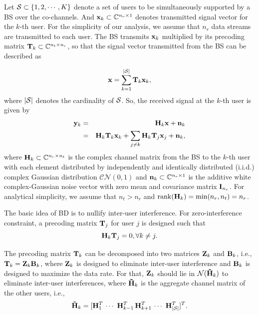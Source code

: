 \documentclass[journal,twoside]{IEEEtranTCOM}
\begin{document}
Let ${\cal{S}} \subset \{1,2,\cdots,K\}$ denote a set of users to be simultaneously supported by a BS over the co-channels. And ${\bf{x}}_k \subset {\mathbb{C}}^{n_r \times 1}$ denotes transmitted signal vector for the $k$-th user. For the simplicity of our analysis, we assume that $n_r$ data streams are transmitted to each user. The BS transmits ${\bf{x}}_k$ multiplied by its precoding matrix ${\bf{T}}_k  \subset {\mathbb{C}}^{n_t \times n_r}$, so that the signal vector transmitted from the BS can be described as

\begin{equation} \label{eq:TransmittedSignal}
{\bf{x}} = \sum\limits_{k = 1}^{\left| \cal{S} \right|} {{{\bf{T}}_k}{{\bf{x}}_k}},
\end{equation}
where ${\left| \cal{S} \right|}$ denotes the cardinality of $\cal{S}$.
So, the received signal at the $k$-th user is given by
\begin{eqnarray} \label{eq:received signal}
{{\bf{y}}_k} &  = & {{\bf{H}}_k}{\bf{x}} + {{\bf{n}}_k}  \nonumber \\
& = & {{\bf{H}}_k}{{\bf{T}}_k}{{\bf{x}}_k} + \sum\limits_{j \ne k} {{{\bf{H}}_k}{{\bf{T}}_j}{{\bf{x}}_j}}  + {{\bf{n}}_k},
\end{eqnarray}
where ${\bf{H}}_k \subset {\mathbb{C}}^{n_r \times n_t}$ is the complex channel matrix from the BS to the $k$-th user with each element distributed by independently and identically distributed (i.i.d.) complex Gaussian distribution ${\mathcal{CN}}(0,1)$ and ${\bf{n}}_k \subset {\mathbb{C}}^{n_r \times 1}$ is the additive white complex-Gaussian noise vector with zero mean and covariance matrix ${\bf{I}}_{n_r}$. For analytical simplicity, we assume that $n_t>n_r$ and $\mathrm{rank}({\bf{H}}_k)=\mathrm{min}(n_r,n_t)=n_r$.

The basic idea of BD is to nullify inter-user interference. For zero-interference constraint, a precoding matrix ${\bf{T}}_j$ for user $j$ is designed such that
\begin{equation} \label{eq:precoder constraint}
{{\bf{H}}_k}{{\bf{T}}_j} = 0,\forall k \ne j.
\end{equation}

The precoding matrix ${{\bf{T}}_k}$ can be decomposed into two matrices ${\bf{Z}}_k$ and ${\bf{B}}_k$, i.e., ${{\bf{T}}_k}={\bf{Z}}_k{\bf{B}}_k$, where ${\bf{Z}}_k$ is designed to eliminate inter-user interference and ${\bf{B}}_k$ is designed to maximize the data rate. For that, ${\bf{Z}}_k$ should lie in ${\cal{N}}({\bf{\tilde H}}_k)$ to eliminate inter-user interferences, where ${\bf{\tilde H}}_k$ is the aggregate channel matrix of the other users, i.e.,
\begin{equation} \label{eq:H_tilde}
{{{\bf{\tilde H}}}_k} = {[{\bf{H}}_1^T\, \cdots \,\,{\bf{H}}_{k - 1}^T\,{\bf{H}}_{k + 1}^T\, \cdots \,\,{\bf{H}}_{\left| \cal{S} \right|}^T]^T}.
\end{equation}
\end{document}
